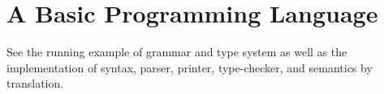 \section{A Basic Programming Language}

\begin{frame}
See the running example of grammar and type system as well as the implementation of syntax, parser, printer, type-checker, and semantics by translation.
\end{frame}
